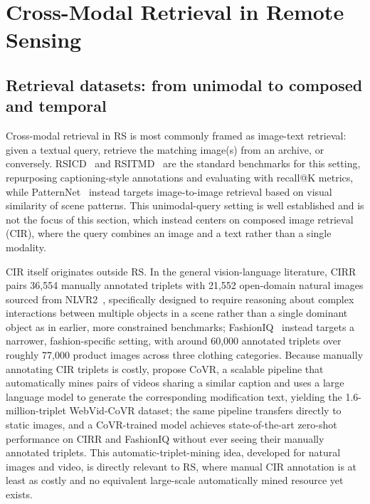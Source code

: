 \section{Cross-Modal Retrieval in Remote Sensing}
\label{sec:rw-retrieval}

\subsection{Retrieval datasets: from unimodal to composed and temporal}
\label{sec:rw-retrieval-datasets}

Cross-modal retrieval in RS is most commonly framed as image-text retrieval: given a textual query, retrieve the matching image(s) from an archive, or conversely. RSICD~\cite{lu2017exploring} and RSITMD~\cite{yuan2022exploring} are the standard benchmarks for this setting, repurposing captioning-style annotations and evaluating with recall@K metrics, while PatternNet~\cite{zhou2018patternnet} instead targets image-to-image retrieval based on visual similarity of scene patterns. This unimodal-query setting is well established and is not the focus of this section, which instead centers on composed image retrieval (CIR), where the query combines an image and a text rather than a single modality.

CIR itself originates outside RS. In the general vision-language literature, CIRR~\cite{liu2021cirr} pairs 36,554 manually annotated triplets with 21,552 open-domain natural images sourced from NLVR2~\cite{NLVR2}, specifically designed to require reasoning about complex interactions between multiple objects in a scene rather than a single dominant object as in earlier, more constrained benchmarks; FashionIQ~\cite{wu2021fashioniq} instead targets a narrower, fashion-specific setting, with around 60,000 annotated triplets over roughly 77,000 product images across three clothing categories. Because manually annotating CIR triplets is costly, \textcite{ventura2024covr} propose CoVR, a scalable pipeline that automatically mines pairs of videos sharing a similar caption and uses a large language model to generate the corresponding modification text, yielding the 1.6-million-triplet WebVid-CoVR dataset; the same pipeline transfers directly to static images, and a CoVR-trained model achieves state-of-the-art zero-shot performance on CIRR and FashionIQ without ever seeing their manually annotated triplets. This automatic-triplet-mining idea, developed for natural images and video, is directly relevant to RS, where manual CIR annotation is at least as costly and no equivalent large-scale automatically mined resource yet exists.

